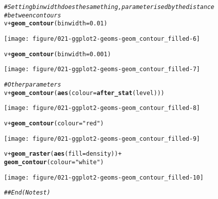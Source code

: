 \documentclass[a4paper,titlepage]{tufte-handout}\usepackage[]{graphicx}\usepackage[]{xcolor}
\makeatletter
\def\maxwidth{ %
  \ifdim\Gin@nat@width>\linewidth
    \linewidth
  \else
    \Gin@nat@width
  \fi
}
\newcommand{\hlnum}[1]{\textcolor[rgb]{0.686,0.059,0.569}{#1}}%
\newcommand{\hlsng}[1]{\textcolor[rgb]{0.192,0.494,0.8}{#1}}%
\newcommand{\hlcom}[1]{\textcolor[rgb]{0.678,0.584,0.686}{\textit{#1}}}%
\newcommand{\hlopt}[1]{\textcolor[rgb]{0,0,0}{#1}}%
\newcommand{\hldef}[1]{\textcolor[rgb]{0.345,0.345,0.345}{#1}}%
\newcommand{\hlkwc}[1]{\textcolor[rgb]{0.333,0.667,0.333}{#1}}%
\newcommand{\hlkwd}[1]{\textcolor[rgb]{0.737,0.353,0.396}{\textbf{#1}}}%
\newenvironment{kframe}{%
 \def\at@end@of@kframe{}%
 \ifinner\ifhmode%
  \def\at@end@of@kframe{\end{minipage}}%
  \begin{minipage}{\columnwidth}%
 \fi\fi%
 \def\FrameCommand##1{\hskip\@totalleftmargin \hskip-\fboxsep
 \colorbox{shadecolor}{##1}\hskip-\fboxsep
     \hskip-\linewidth \hskip-\@totalleftmargin \hskip\columnwidth}%
 \MakeFramed {\advance\hsize-\width
   \@totalleftmargin\z@ \linewidth\hsize
   \@setminipage}}%
 {\par\unskip\endMakeFramed%
 \at@end@of@kframe}
\newenvironment{knitrout}{}{} %
\makeatother
\begin{document}
\begin{knitrout}
\begin{kframe}\begin{alltt}
\hlcom{# Setting binwidth does the same thing, parameterised by the distance}
\hlcom{# between contours}
\hldef{v} \hlopt{+} \hlkwd{geom_contour}\hldef{(}\hlkwc{binwidth} \hldef{=} \hlnum{0.01}\hldef{)}
\end{alltt}
\end{kframe}
\texttt{[image: figure/021-ggplot2-geoms-geom\_contour\_filled-6]} 
\begin{kframe}\begin{alltt}
\hldef{v} \hlopt{+} \hlkwd{geom_contour}\hldef{(}\hlkwc{binwidth} \hldef{=} \hlnum{0.001}\hldef{)}
\end{alltt}
\end{kframe}
\texttt{[image: figure/021-ggplot2-geoms-geom\_contour\_filled-7]} 
\begin{kframe}\begin{alltt}
\hlcom{# Other parameters}
\hldef{v} \hlopt{+} \hlkwd{geom_contour}\hldef{(}\hlkwd{aes}\hldef{(}\hlkwc{colour} \hldef{=} \hlkwd{after_stat}\hldef{(level)))}
\end{alltt}
\end{kframe}
\texttt{[image: figure/021-ggplot2-geoms-geom\_contour\_filled-8]} 
\begin{kframe}\begin{alltt}
\hldef{v} \hlopt{+} \hlkwd{geom_contour}\hldef{(}\hlkwc{colour} \hldef{=} \hlsng{"red"}\hldef{)}
\end{alltt}
\end{kframe}
\texttt{[image: figure/021-ggplot2-geoms-geom\_contour\_filled-9]} 
\begin{kframe}\begin{alltt}
\hldef{v} \hlopt{+} \hlkwd{geom_raster}\hldef{(}\hlkwd{aes}\hldef{(}\hlkwc{fill} \hldef{= density))} \hlopt{+}
  \hlkwd{geom_contour}\hldef{(}\hlkwc{colour} \hldef{=} \hlsng{"white"}\hldef{)}
\end{alltt}
\end{kframe}
\texttt{[image: figure/021-ggplot2-geoms-geom\_contour\_filled-10]} 
\begin{kframe}\begin{alltt}
\hlcom{## End(No test)}
\end{alltt}
\end{kframe}
\end{knitrout}
\end{document}
